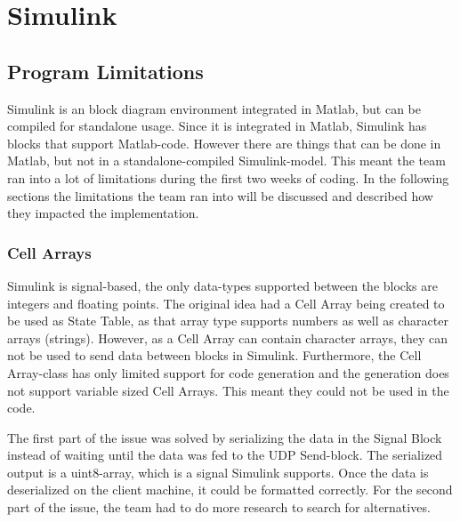 \section{Simulink}\label{sec:simulink}

\subsection{Program Limitations}\label{sec:simprolim}
Simulink is an block diagram environment integrated in Matlab, but can be compiled for standalone usage. Since it is integrated in Matlab, Simulink has blocks that support Matlab-code. However there are things that can be done in Matlab, but not in a standalone-compiled Simulink-model. This meant the team ran into a lot of limitations during the first two weeks of coding. In the following sections the limitations the team ran into will be discussed and described how they impacted the implementation.

\subsubsection{Cell Arrays}
Simulink is signal-based, the only data-types supported between the blocks are integers and floating points. The original idea had a Cell Array being created to be used as State Table, as that array type supports numbers as well as character arrays (strings). However, as a Cell Array can contain character arrays, they can not be used to send data between blocks in Simulink. Furthermore, the Cell Array-class has only limited support for code generation and the generation does not support variable sized Cell Arrays. This meant they could not be used in the code.

The first part of the issue was solved by serializing the data in the Signal Block instead of waiting until the data was fed to the UDP Send-block. The serialized output is a uint8-array, which is a signal Simulink supports. Once the data is deserialized on the client machine, it could be formatted correctly. For the second part of the issue, the team had to do more research to search for alternatives.

